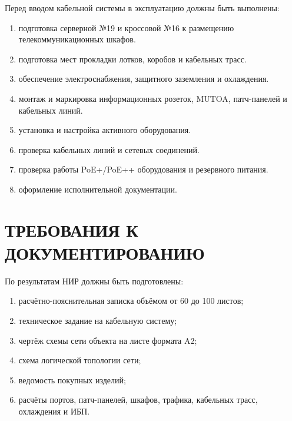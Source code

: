 \documentclass[a4paper,oneside,14pt]{extreport}
\begin{document}
Перед вводом кабельной системы в эксплуатацию должны быть выполнены:

\begin{enumerate}[label=\asbuk*)]
    \item подготовка серверной №19 и кроссовой №16 к размещению телекоммуникационных шкафов.
    \item подготовка мест прокладки лотков, коробов и кабельных трасс.
    \item обеспечение электроснабжения, защитного заземления и охлаждения.
    \item монтаж и маркировка информационных розеток, MUTOA, патч-панелей и кабельных линий.
    \item установка и настройка активного оборудования.
    \item проверка кабельных линий и сетевых соединений.
    \item проверка работы PoE+/PoE++ оборудования и резервного питания.
    \item оформление исполнительной документации.
\end{enumerate}


\chapter{ТРЕБОВАНИЯ К ДОКУМЕНТИРОВАНИЮ}

По результатам НИР должны быть подготовлены:

\begin{enumerate}[label=\asbuk*)]
    \item расчётно-пояснительная записка объёмом от 60 до 100 листов;
    \item техническое задание на кабельную систему;
    \item чертёж схемы сети объекта на листе формата A2;
    \item схема логической топологии сети;
    \item ведомость покупных изделий;
    \item расчёты портов, патч-панелей, шкафов, трафика, кабельных трасс, охлаждения и ИБП.
\end{enumerate}

\end{document}
